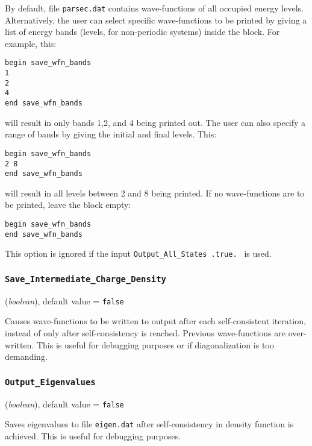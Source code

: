\documentclass{article}
\begin{document}
By default, file {\tt parsec.dat} contains wave-functions of all occupied
energy levels. Alternatively, the user can select specific
wave-functions to be printed by giving a list of energy bands (levels,
for non-periodic systems) inside the block. For example, this:

\begin{verbatim}
begin save_wfn_bands
1
2
4
end save_wfn_bands
\end{verbatim}

will result in only bands 1,2, and 4 being printed out. The user can
also specify a range of bands by giving the initial and final
levels. This:

\begin{verbatim}
begin save_wfn_bands
2 8
end save_wfn_bands
\end{verbatim}

will result in all levels between 2 and 8 being printed. If no
wave-functions are to be printed, leave the block empty:

\begin{verbatim}
begin save_wfn_bands
end save_wfn_bands
\end{verbatim}

This option is ignored if the input {\tt Output\_All\_States  .true. }
is used. 

\subsubsection{\tt Save\_Intermediate\_Charge\_Density 
\label{SaveIntermediateChargeDensity}}
({\it boolean}),
default value = {\tt false }

Causes wave-functions to be written to output after each self-consistent
iteration, instead of only after self-consistency is reached. Previous
wave-functions are over-written. This is useful for debugging purposes or
if diagonalization is too demanding.

\subsubsection{\tt Output\_Eigenvalues 
\label{OutputEigenvalues}}
({\it boolean}),
default value = {\tt false }

Saves eigenvalues to file {\tt eigen.dat} after self-consistency in density
function is achieved. This is useful for debugging purposes.
\end{document}
